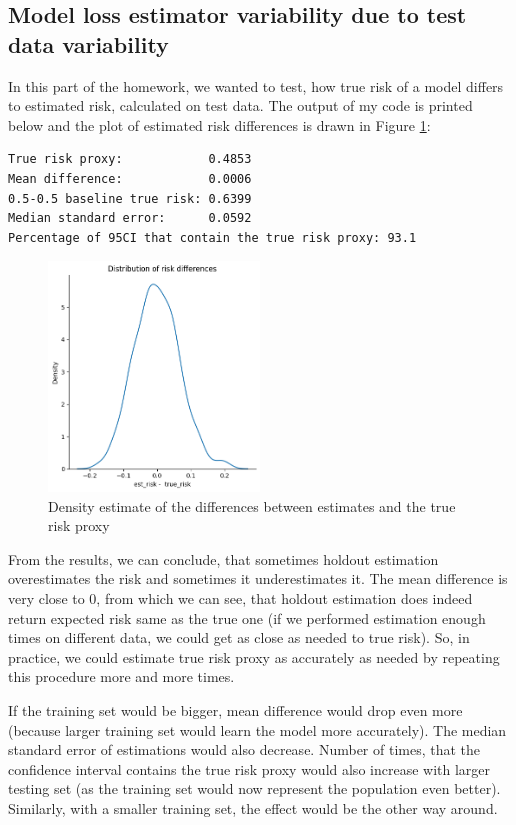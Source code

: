 \documentclass{article}
\begin{document}
\subsection{Model loss estimator variability due to test data variability}

In this part of the homework, we wanted to test, how true risk of a model differs to estimated risk, calculated on test data. The output of my code is printed below and the plot of estimated risk differences is drawn in Figure \ref{fig:risk_differences_1}:

\begin{lstlisting}[basicstyle=\small\ttfamily]
True risk proxy:            0.4853
Mean difference:            0.0006
0.5-0.5 baseline true risk: 0.6399
Median standard error:      0.0592
Percentage of 95CI that contain the true risk proxy: 93.1
\end{lstlisting}

\begin{figure}[h]
    \centering
    \includegraphics[width=0.5\textwidth]{homework-02/plots/risk_differences_1.png}
    \caption{Density estimate of the differences between estimates and the true risk proxy}
    \label{fig:risk_differences_1}
\end{figure}

From the results, we can conclude, that sometimes holdout estimation overestimates the risk and sometimes it underestimates it. The mean difference is very close to 0, from which we can see, that holdout estimation does indeed return expected risk same as the true one (if we performed estimation enough times on different data, we could get as close as needed to true risk). So, in practice, we could estimate true risk proxy as accurately as needed by repeating this procedure more and more times.

If the training set would be bigger, mean difference would drop even more (because larger training set would learn the model more accurately). The median standard error of estimations would also decrease. Number of times, that the confidence interval contains the true risk proxy would also increase with larger testing set (as the training set would now represent the population even better). Similarly, with a smaller training set, the effect would be the other way around.
\end{document}
